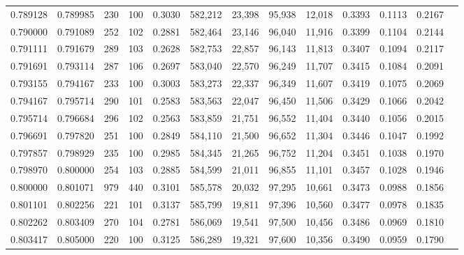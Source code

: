 \begin{tabular}{rrrrrrrrrrrrr}
0.789128 & 0.789985 &    230 &   100 &                                     0.3030 & 582,212 &  23,398 &  95,938 &  12,018 & 0.3393 & 0.1113 & 0.2167 \\
0.790000 & 0.791089 &    252 &   102 &                                     0.2881 & 582,464 &  23,146 &  96,040 &  11,916 & 0.3399 & 0.1104 & 0.2144 \\
0.791111 & 0.791679 &    289 &   103 &                                     0.2628 & 582,753 &  22,857 &  96,143 &  11,813 & 0.3407 & 0.1094 & 0.2117 \\
0.791691 & 0.793114 &    287 &   106 &                                     0.2697 & 583,040 &  22,570 &  96,249 &  11,707 & 0.3415 & 0.1084 & 0.2091 \\
0.793155 & 0.794167 &    233 &   100 &                                     0.3003 & 583,273 &  22,337 &  96,349 &  11,607 & 0.3419 & 0.1075 & 0.2069 \\
0.794167 & 0.795714 &    290 &   101 &                                     0.2583 & 583,563 &  22,047 &  96,450 &  11,506 & 0.3429 & 0.1066 & 0.2042 \\
0.795714 & 0.796684 &    296 &   102 &                                     0.2563 & 583,859 &  21,751 &  96,552 &  11,404 & 0.3440 & 0.1056 & 0.2015 \\
0.796691 & 0.797820 &    251 &   100 &                                     0.2849 & 584,110 &  21,500 &  96,652 &  11,304 & 0.3446 & 0.1047 & 0.1992 \\
0.797857 & 0.798929 &    235 &   100 &                                     0.2985 & 584,345 &  21,265 &  96,752 &  11,204 & 0.3451 & 0.1038 & 0.1970 \\
0.798970 & 0.800000 &    254 &   103 &                                     0.2885 & 584,599 &  21,011 &  96,855 &  11,101 & 0.3457 & 0.1028 & 0.1946 \\
0.800000 & 0.801071 &    979 &   440 &                                     0.3101 & 585,578 &  20,032 &  97,295 &  10,661 & 0.3473 & 0.0988 & 0.1856 \\
0.801101 & 0.802256 &    221 &   101 &                                     0.3137 & 585,799 &  19,811 &  97,396 &  10,560 & 0.3477 & 0.0978 & 0.1835 \\
0.802262 & 0.803409 &    270 &   104 &                                     0.2781 & 586,069 &  19,541 &  97,500 &  10,456 & 0.3486 & 0.0969 & 0.1810 \\
0.803417 & 0.805000 &    220 &   100 &                                     0.3125 & 586,289 &  19,321 &  97,600 &  10,356 & 0.3490 & 0.0959 & 0.1790 \\

\end{tabular}
